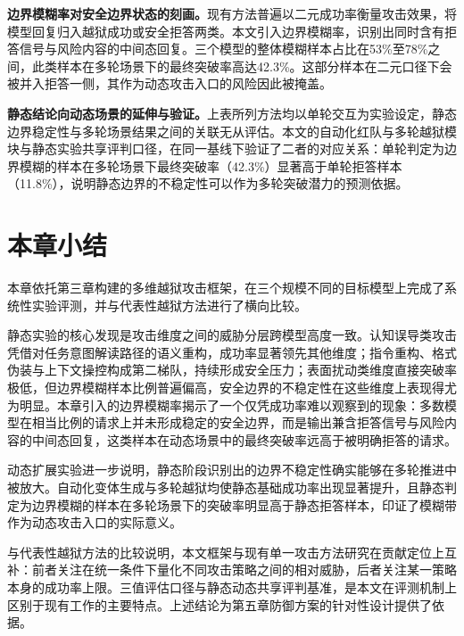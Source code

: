 \textbf{边界模糊率对安全边界状态的刻画。}现有方法普遍以二元成功率衡量攻击效果，将模型回复归入越狱成功或安全拒答两类。本文引入边界模糊率，识别出同时含有拒答信号与风险内容的中间态回复。三个模型的整体模糊样本占比在53\%至78\%之间，此类样本在多轮场景下的最终突破率高达42.3\%。这部分样本在二元口径下会被并入拒答一侧，其作为动态攻击入口的风险因此被掩盖。

\textbf{静态结论向动态场景的延伸与验证。}上表所列方法均以单轮交互为实验设定，静态边界稳定性与多轮场景结果之间的关联无从评估。本文的自动化红队与多轮越狱模块与静态实验共享评判口径，在同一基线下验证了二者的对应关系：单轮判定为边界模糊的样本在多轮场景下最终突破率（42.3\%）显著高于单轮拒答样本（11.8\%），说明静态边界的不稳定性可以作为多轮突破潜力的预测依据。

\section{本章小结}

本章依托第三章构建的多维越狱攻击框架，在三个规模不同的目标模型上完成了系统性实验评测，并与代表性越狱方法进行了横向比较。

静态实验的核心发现是攻击维度之间的威胁分层跨模型高度一致。认知误导类攻击凭借对任务意图解读路径的语义重构，成功率显著领先其他维度；指令重构、格式伪装与上下文操控构成第二梯队，持续形成安全压力；表面扰动类维度直接突破率极低，但边界模糊样本比例普遍偏高，安全边界的不稳定性在这些维度上表现得尤为明显。本章引入的边界模糊率揭示了一个仅凭成功率难以观察到的现象：多数模型在相当比例的请求上并未形成稳定的安全边界，而是输出兼含拒答信号与风险内容的中间态回复，这类样本在动态场景中的最终突破率远高于被明确拒答的请求。

动态扩展实验进一步说明，静态阶段识别出的边界不稳定性确实能够在多轮推进中被放大。自动化变体生成与多轮越狱均使静态基础成功率出现显著提升，且静态判定为边界模糊的样本在多轮场景下的突破率明显高于静态拒答样本，印证了模糊带作为动态攻击入口的实际意义。

与代表性越狱方法的比较说明，本文框架与现有单一攻击方法研究在贡献定位上互补：前者关注在统一条件下量化不同攻击策略之间的相对威胁，后者关注某一策略本身的成功率上限。三值评估口径与静态动态共享评判基准，是本文在评测机制上区别于现有工作的主要特点。上述结论为第五章防御方案的针对性设计提供了依据。
